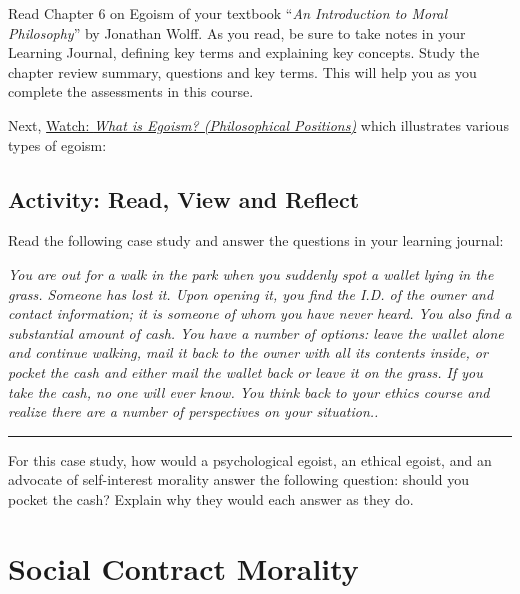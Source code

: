 \documentclass[
]{book}
\begin{document}
\begin{reflect}
Read Chapter 6 on Egoism of your textbook ``\emph{An Introduction to Moral Philosophy}'' by Jonathan Wolff. As you read, be sure to take notes in your Learning Journal, defining key terms and explaining key concepts. Study the chapter review summary, questions and key terms. This will help you as you complete the assessments in this course.

Next, \href{https://www.youtube.com/watch?v=jpHggd-3_rM}{Watch: \emph{What is Egoism? (Philosophical Positions)}} which illustrates various types of egoism:
\end{reflect}

\hypertarget{activity-read-view-and-reflect-2}{%
\subsection*{Activity: Read, View and Reflect}\label{activity-read-view-and-reflect-2}}

\begin{reflect}
Read the following case study and answer the questions in your learning journal:

\emph{You are out for a walk in the park when you suddenly spot a wallet lying in the grass. Someone has lost it. Upon opening it, you find the I.D. of the owner and contact information; it is someone of whom you have never heard. You also find a substantial amount of cash. You have a number of options: leave the wallet alone and continue walking, mail it back to the owner with all its contents inside, or pocket the cash and either mail the wallet back or leave it on the grass. If you take the cash, no one will ever know. You think back to your ethics course and realize there are a number of perspectives on your situation..}

\begin{center}\rule{0.5\linewidth}{0.5pt}\end{center}

For this case study, how would a psychological egoist, an ethical egoist, and an advocate of self-interest morality answer the following question: should you pocket the cash? Explain why they would each answer as they do.
\end{reflect}

\hypertarget{social-contract-morality}{%
\section{Social Contract Morality}\label{social-contract-morality}}
\end{document}
